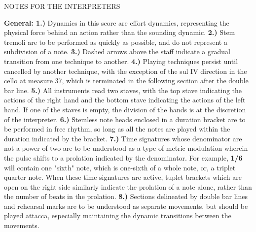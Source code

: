 \documentclass[11pt]{article}
\begin{document}
\begingroup
\begin{center}
\huge 
\end{center}
\endgroup

\begingroup
\begin{center}
\huge NOTES FOR THE INTERPRETERS
\end{center}
\endgroup

\begingroup
\begin{center}
\textbf{General: 1.)} Dynamics in this score are effort dynamics, representing the physical force behind an action rather than the sounding dynamic. \textbf{2.)} Stem tremoli are to be performed as quickly as possible, and do not represent a subdivision of a note. \textbf{3.)} Dashed arrows above the staff indicate a gradual transition from one technique to another. \textbf{4.)}  Playing techniques persist until cancelled by another technique, with the exception of the sul IV direction in the cello at measure 37, which is terminated in the following section after the double bar line. \textbf{5.)}  All instruments read two staves, with the top stave indicating the actions of the right hand and the bottom stave indicating the actions of the left hand. If one of the staves is empty, the division of the hands is at the discretion of the interpreter. \textbf{6.)} Stemless note heads enclosed in a duration bracket are to be performed in free rhythm, so long as all the notes are played within the duration indicated by the bracket. \textbf{7.)} Time signatures whose denominator are not a power of two are to be understood as a type of metric modulation wherein the pulse shifts to a prolation indicated by the denominator. For example, \textbf{1/6} will contain one "sixth" note, which is one-sixth of a whole note, or, a triplet quarter note. When these time signatures are active, tuplet brackets which are open on the right side similarly indicate the prolation of a note alone, rather than the number of beats in the prolation. \textbf{8.)} Sections delineated by double bar lines and rehearsal marks are to be understood as separate movements, but should be played attacca, especially maintaining the dynamic transitions between the movements.\\
\rightskip\leftskip
\end{center}
\endgroup
\end{document}
